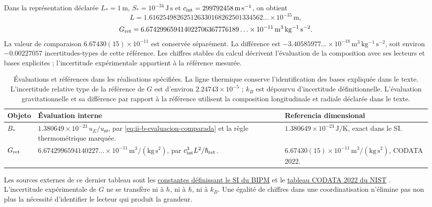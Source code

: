 Dans la représentation déclarée \(L_*=1\,\mathrm m\),
\(S_*=10^{-34}\,\mathrm{J\,s}\) et
\(c_{\rm int}=299792458\,\mathrm{m\,s^{-1}}\), on obtient
\[
 L=1.616254982625126330168262501334562\ldots\times10^{-35}
 \,\mathrm m,
\]
\[
 G_{\rm ret}=6.674299659414022706367776189\ldots\times10^{-11}
 \,\mathrm{m^3\,kg^{-1}\,s^{-2}}.
\]
La valeur de comparaison \(6.67430(15)\times10^{-11}\) est conservée
séparément. La différence est
\(-3.40585977\ldots\times10^{-18}\,\mathrm{m^3\,kg^{-1}\,s^{-2}}\),
soit environ \(-0.00227057\) incertitudes-types de cette référence.
Les chiffres stables du calcul décrivent l’évaluation de la composition
avec ses lecteurs et bases explicites ; l’incertitude expérimentale appartient
à la référence mesurée.

\begin{table}[htbp]
\centering\small
\begin{tabularx}{\linewidth}{@{}lXX@{}}
\toprule
Objeto & Évaluation interne & Referencia dimensional\\
\midrule
\(B_*\) & \(1.380649\times10^{-23}\,u_E/u_\Theta\),
par \eqref{eq:ii-b-evaluacion-comparada} et la règle thermométrique marquée.
& \(1.380649\times10^{-23}\,\mathrm{J/K}\), exact dans le SI.\\[4pt]
\(G_{\rm ret}\) & \(6.6742996594140227\ldots\times10^{-11}\,
\mathrm{m^3/(kg\,s^2)}\), par \(c_{\rm int}^3L^2/\hbar_{\rm ret}\).
& \(6.67430(15)\times10^{-11}\,\mathrm{m^3/(kg\,s^2)}\), CODATA 2022.\\
\bottomrule
\end{tabularx}
\caption{Évaluations et références dans les réalisations spécifiées.
La ligne thermique conserve l’identification des bases expliquée dans le texte.
L’incertitude
relative type de la référence de \(G\) est d’environ
\(2.24743\times10^{-5}\) ; \(k_B\) est dépourvu d’incertitude définitionnelle.
L’évaluation gravitationnelle et sa différence par rapport à la référence
utilisent la composition longitudinale et radiale déclarée dans le texte.}
\label{tab:ii-kb-g-cartas}
\end{table}

Les sources externes de ce dernier tableau sont les
\href{https://www.bipm.org/en/measurement-units/si-defining-constants}
{constantes définissant le SI du BIPM} et le
\href{https://physics.nist.gov/cuu/Constants/Table/allascii.txt}
{tableau CODATA 2022 du NIST} \cite{codata2022}.
L’incertitude expérimentale de \(G\) ne se transfère ni à \(h\),
ni à \(\hbar\), ni à \(k_B\). Une égalité de chiffres dans une coordinatisation
n’élimine pas non plus la nécessité d’identifier le lecteur qui produit la grandeur.

